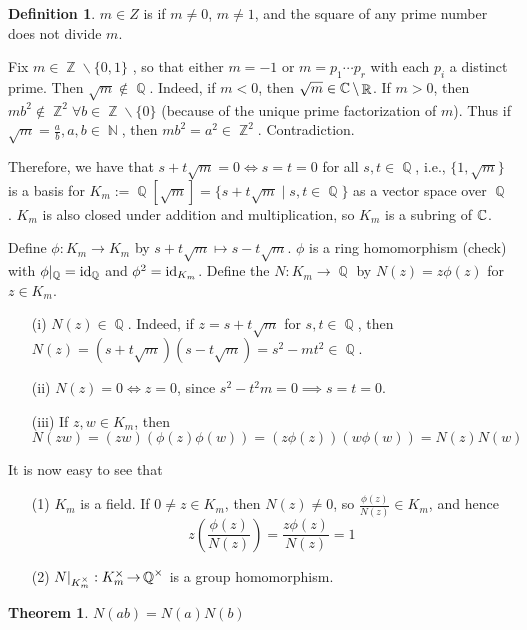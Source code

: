\documentclass[11pt]{book}
\newcounter{counter}
\newtheorem{theorem}[counter]{Theorem}   \newtheorem*{theorem*}{Theorem}   \newtheorem{lemma}[counter]{Lemma}   \newtheorem{corollary}[counter]{Corollary}
\theoremstyle{definition}   \newtheorem{defn}[counter]{Definition} %
\newcommand{\bs}{\backslash}   \newcommand{\A}{\mathcal{A}}   \newcommand{\sy}{\textnormal{Syl}}   \newcommand{\size}[1]{\left| #1 \right|}
\DeclareMathOperator{\R}{\mathbb{R}}   \DeclareMathOperator{\N}{\mathbb{N}}   \DeclareMathOperator{\z}{\mathbb{Z}}   \DeclareMathOperator{\Q}{\mathbb{Q}}
\DeclareMathOperator{\ra}{\rightarrow}   \DeclareMathOperator{\Poly}{\mathbf{P}}   \DeclareMathOperator{\spn}{\textnormal{span}}   \DeclareMathOperator{\aut}{\textnormal{Aut}}
\newcommand{\vs}{\vspace{8pt}}
\numberwithin{counter}{chapter}
\begin{document}
\vs

\begin{defn}
	$m \in Z$ is  if $m \neq 0$, $m \neq 1$, and the square of any prime number does not divide $m$.
\end{defn}


\begin{remark}
Fix $m \in \z\bs\{0,1\}$ , so that either $m = -1$ or $m = p_1 \cdots p_r$ with each $p_i$ a distinct prime. Then $\sqrt{m} \notin \Q$. Indeed, if $m < 0$, then $\sqrt{m} \in \C \bs \R$. If $m > 0$, then $mb^2 \notin \z^2 \forall b \in \z\bs\{0\}$ (because of the unique prime factorization of $m$). Thus if $\sqrt{m} = \frac{a}{b}, a,b \in \N$, then $mb^2 = a^2 \in \z^2$. Contradiction.

Therefore, we have that $s + t\sqrt{m} = 0 \iff s=t=0$ for all $s,t \in \Q$, i.e., $\{1,\sqrt{m}\}$ is a basis for $K_m := \Q[\sqrt{m}] = \{s + t\sqrt{m} \mid s,t \in \Q\}$ as a vector space over $\Q$. $K_m$ is also closed under addition and multiplication, so $K_m$ is a subring of $\operatorname{\mathbb{C}}$.

Define $\phi : K_m \ra K_m$ by $s+t\sqrt{m} \mapsto s-t\sqrt{m}$. $\phi$ is a ring homomorphism (check) with $\phi|_{\Q} = \id_{\Q}$ and $\phi^2 = \textnormal{id}_{K_m}$. Define the  $N : K_m \ra \Q$ by $N(z) = z \phi(z)$ for $z \in K_m$.
\begin{enumerate}
\item[(i)] $N(z) \in \Q$. Indeed, if $z = s+t\sqrt{m}$ for $s,t \in \Q$, then $N(z) = (s+t\sqrt{m})(s-t\sqrt{m}) = s^2-mt^2 \in \Q$.
\item[(ii)] $N(z) =0 \iff z=0$, since $s^2-t^2m = 0 \implies s=t=0$.
\item[(iii)] If $z,w \in K_m$, then
	\[N(zw) = (zw)(\phi(z)\phi(w)) = (z\phi(z))(w\phi(w)) = N(z)N(w) \]
\end{enumerate}
It is now easy to see that
\begin{enumerate}
\item[(1)] $K_m$ is a field. If $0 \ne z \in K_m$, then $N(z) \ne 0$, so $\frac{\phi(z)}{N(z)} \in K_m$, and hence
	\[z \left(\frac{\phi(z)}{N(z)}\right) = \frac{z \phi(z)}{N(z)} = 1 \]
\item[(2)] $N|_{K_m\x} : K_m\x \ra \Q\x$ is a group homomorphism.
\end{enumerate}
\end{remark}

\vs

\begin{theorem}
	$N(ab) = N(a)N(b)$
\end{theorem}
\end{document}
